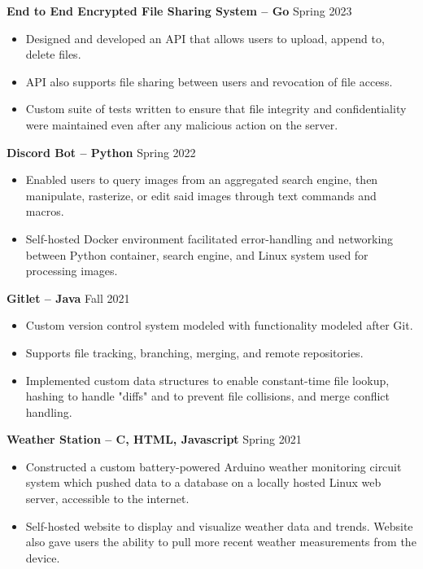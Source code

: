 \documentclass{article}
\begin{document}

\begin{adjustwidth}{1em}{1em}

    \textbf{End to End Encrypted File Sharing System -- Go} \hfill Spring 2023
    \begin{itemize}
        \item Designed and developed an API that allows users to upload, append to, delete files.
        \item API also supports file sharing between users and revocation of file access.
        \item Custom suite of tests written to ensure that file integrity and confidentiality were maintained even after any malicious action on the server.
    \end{itemize}

    \vspace{1mm}

    \textbf{Discord Bot -- Python} \hfill Spring 2022
    \begin{itemize}
        \item Enabled users to query images from an aggregated search engine, then manipulate, rasterize, or edit said images through text commands and macros.
        \item Self-hosted Docker environment facilitated error-handling and networking between Python container, search engine, and Linux system used for processing images.
    \end{itemize}

    \textbf{Gitlet -- Java} \hfill Fall 2021
    \begin{itemize}
        \item Custom version control system modeled with functionality modeled after Git.
        \item Supports file tracking, branching, merging, and remote repositories.
        \item Implemented custom data structures to enable constant-time file lookup, hashing to handle "diffs" and to prevent file collisions, and merge conflict handling.
    \end{itemize}

    \vspace{1mm}

    \noindent \textbf{Weather Station -- C, HTML, Javascript} \hfill Spring 2021
    \begin{itemize}
        \item Constructed a custom battery-powered Arduino weather monitoring circuit system which pushed data to a database on a locally hosted Linux web server, accessible to the internet.
        \item Self-hosted website to display and visualize weather data and trends. Website also gave users the ability to pull more recent weather measurements from the device.
    \end{itemize}


\end{adjustwidth}
\end{document}
